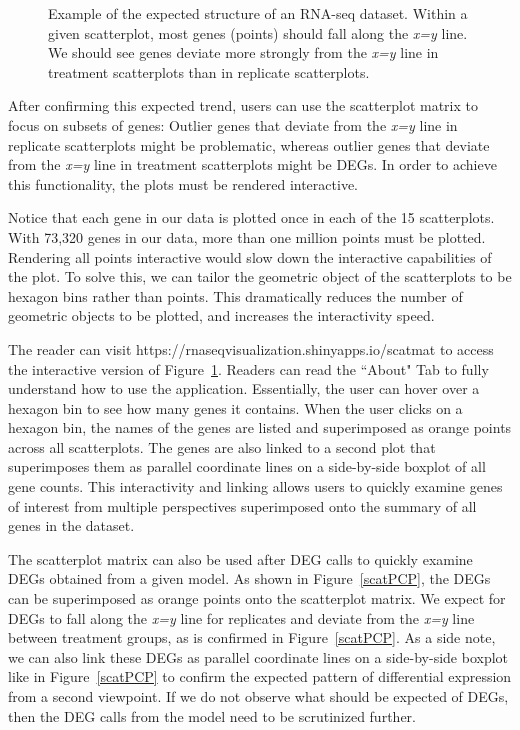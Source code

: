 \documentclass[useAMS,referee]{biom}
\begin{document}
\begin{figure}
\begin{center}
\centerline{}
\end{center}
\caption{Example of the expected structure of an RNA-seq dataset. Within a given scatterplot, most genes (points) should fall along the \textit{x=y} line. We should see genes deviate more strongly from the \textit{x=y} line in treatment scatterplots than in replicate scatterplots.
\label{cotyIdeal}}
\end{figure}

After confirming this expected trend, users can use the scatterplot matrix to focus on subsets of genes: Outlier genes that deviate from the \textit{x=y} line in replicate scatterplots might be problematic, whereas outlier genes that deviate from the \textit{x=y} line in treatment scatterplots might be DEGs. In order to achieve this functionality, the plots must be rendered interactive.

Notice that each gene in our data is plotted once in each of the 15 scatterplots. With 73,320 genes in our data, more than one million points must be plotted. Rendering all points interactive would slow down the interactive capabilities of the plot. To solve this, we can tailor the geometric object of the scatterplots to be hexagon bins rather than points. This dramatically reduces the number of geometric objects to be plotted, and increases the interactivity speed.

The reader can visit https://rnaseqvisualization.shinyapps.io/scatmat to access the interactive version of Figure~\ref{cotyIdeal}. Readers can read the ``About" Tab to fully understand how to use the application. Essentially, the user can hover over a hexagon bin to see how many genes it contains. When the user clicks on a hexagon bin, the names of the genes are listed and superimposed as orange points across all scatterplots. The genes are also linked to a second plot that superimposes them as parallel coordinate lines on a side-by-side boxplot of all gene counts. This interactivity and linking allows users to quickly examine genes of interest from multiple perspectives superimposed onto the summary of all genes in the dataset. 

The scatterplot matrix can also be used after DEG calls to quickly examine DEGs obtained from a given model. As shown in Figure~\ref{scatPCP}, the DEGs can be superimposed as orange points onto the scatterplot matrix. We expect for DEGs to fall along the \textit{x=y} line for replicates and deviate from the \textit{x=y} line between treatment groups, as is confirmed in Figure~\ref{scatPCP}. As a side note, we can also link these DEGs as parallel coordinate lines on a side-by-side boxplot like in Figure~\ref{scatPCP} to confirm the expected pattern of differential expression from a second viewpoint. If we do not observe what should be expected of DEGs, then the DEG calls from the model need to be scrutinized further.
\end{document}
